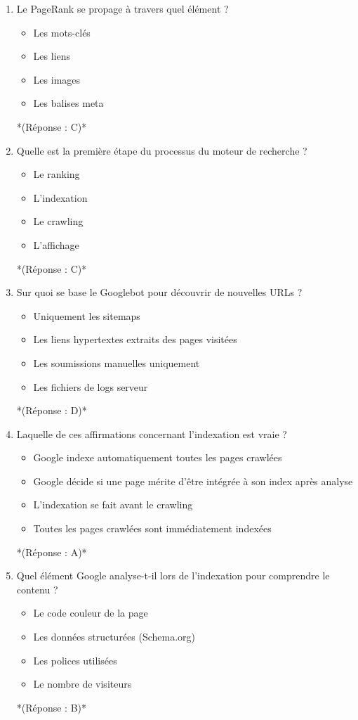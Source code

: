 \documentclass[12pt,a4paper,twoside]{report}
\begin{document}
\begin{enumerate}
\item Le PageRank se propage à travers quel élément ?
\begin{itemize}
\item[A)] Les mots-clés
\item[B)] Les liens
\item[C)] Les images
\item[D)] Les balises meta
\end{itemize}
*(Réponse : C)*

\item Quelle est la première étape du processus du moteur de recherche ?
\begin{itemize}
\item[A)] Le ranking
\item[B)] L'indexation
\item[C)] Le crawling
\item[D)] L'affichage
\end{itemize}
*(Réponse : C)*

\item Sur quoi se base le Googlebot pour découvrir de nouvelles URLs ?
\begin{itemize}
\item[A)] Uniquement les sitemaps
\item[B)] Les liens hypertextes extraits des pages visitées
\item[C)] Les soumissions manuelles uniquement
\item[D)] Les fichiers de logs serveur
\end{itemize}
*(Réponse : D)*

\item Laquelle de ces affirmations concernant l'indexation est vraie ?
\begin{itemize}
\item[A)] Google indexe automatiquement toutes les pages crawlées
\item[B)] Google décide si une page mérite d'être intégrée à son index après analyse
\item[C)] L'indexation se fait avant le crawling
\item[D)] Toutes les pages crawlées sont immédiatement indexées
\end{itemize}
*(Réponse : A)*

\item Quel élément Google analyse-t-il lors de l'indexation pour comprendre le contenu ?
\begin{itemize}
\item[A)] Le code couleur de la page
\item[B)] Les données structurées (Schema.org)
\item[C)] Les polices utilisées
\item[D)] Le nombre de visiteurs
\end{itemize}
*(Réponse : B)*


\end{enumerate}
\end{document}
